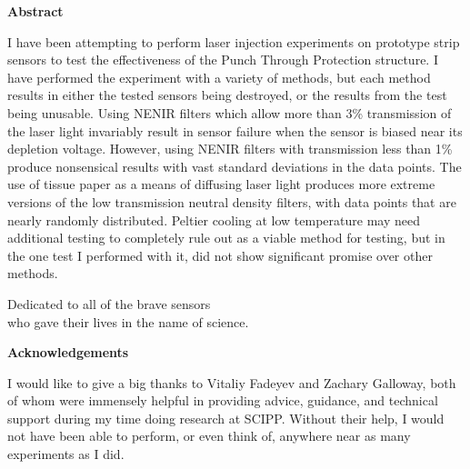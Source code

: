 \documentclass{report}
\begin{document}
        \begin{center} \LARGE \textbf{Abstract} \end{center}
        I have been attempting to perform laser injection experiments on prototype strip sensors to test the effectiveness of the Punch Through Protection structure. I have performed the experiment with a variety of methods, but each method results in either the tested sensors being destroyed, or the results from the test being unusable. Using NENIR filters which allow more than 3\% transmission of the laser light invariably result in sensor failure when the sensor is biased near its depletion voltage. However, using NENIR filters with transmission less than 1\% produce nonsensical results with vast standard deviations in the data points. The use of tissue paper as a means of diffusing laser light produces more extreme versions of the low transmission neutral density filters, with data points that are nearly randomly distributed. Peltier cooling at low temperature may need additional testing to completely rule out as a viable method for testing, but in the one test I performed with it, did not show significant promise over other methods.


    \newpage


    \tableofcontents


    \newpage \vspace*{\fill}
        \begin{center} \begin{large}
            Dedicated to all of the brave sensors\\
            who gave their lives in the name of science.
        \end{large} \end{center}
    \vspace*{\fill} \newpage \vspace*{\fill}
        \begin{center} \begin{large}
            \large \textbf{Acknowledgements} \vspace{\baselineskip}

            I would like to give a big thanks to Vitaliy Fadeyev and Zachary Galloway, both of whom were immensely helpful in providing advice, guidance, and technical support during my time doing research at SCIPP. Without their help, I would not have been able to perform, or even think of, anywhere near as many experiments as I did.

        \end{large} \end{center}
    \vspace*{\fill} \newpage
\end{document}
